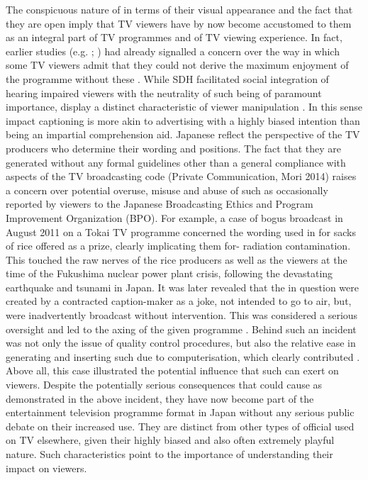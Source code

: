 \documentclass[output=paper]{langsci/langscibook}
\begin{document}
The conspicuous nature of  in terms of their visual appearance and the fact that they are open  imply that TV viewers have by now become accustomed to them as an integral part of TV programmes and of TV viewing experience. In fact, earlier studies (e.g. \citealt{Sakamoto1999}; \citealt{Kimura2000}) had already signalled a concern over the way in which some TV viewers admit that they could not derive the maximum enjoyment of the programme without these . While SDH facilitated social integration of hearing impaired viewers \citep[279]{diaz2013} with the neutrality of such  being of paramount importance,  display a distinct characteristic of viewer manipulation \citep{Shiota2003, ohagan2010, Sasamoto2014}. In this sense impact captioning is more akin to advertising with a highly biased intention than being an impartial comprehension aid. Japanese  reflect the perspective of the TV producers who   determine their wording and positions. The fact that they are generated without any formal guidelines other than a general compliance with aspects of the TV broadcasting code (Private Communication, Mori 2014) raises a concern over potential overuse, misuse and abuse of such  as occasionally reported by viewers to the Japanese Broadcasting Ethics and Program Improvement Organization (BPO). For example, a case of bogus  broadcast in August 2011 on a Tokai TV programme concerned the wording used in  for sacks of rice offered as a prize, clearly implicating them for- radiation contamination. This touched the raw nerves of the rice producers as well as the viewers at the time of the Fukushima nuclear power plant crisis, following the devastating earthquake and tsunami in Japan. It was later revealed that the  in question were created by a contracted caption-maker as a joke, not intended to go to air, but, were inadvertently broadcast without intervention. This was considered a serious oversight and led to the axing of the given programme \citep[36--37]{Kato2012}.  Behind such an incident was not only the issue of quality control procedures, but also the relative ease in generating and inserting such  due to computerisation, which clearly contributed \citep{Kato2012}. Above all, this case illustrated the potential influence that such  can exert on viewers.  Despite the potentially serious consequences that  could cause as demonstrated in the above incident, they have now become part of the entertainment television programme format in Japan without any serious public debate on their increased use. They are distinct from other types of official  used on TV elsewhere, given their highly biased and also often extremely playful nature. Such characteristics point to the importance of understanding their impact on viewers. 
\end{document}
